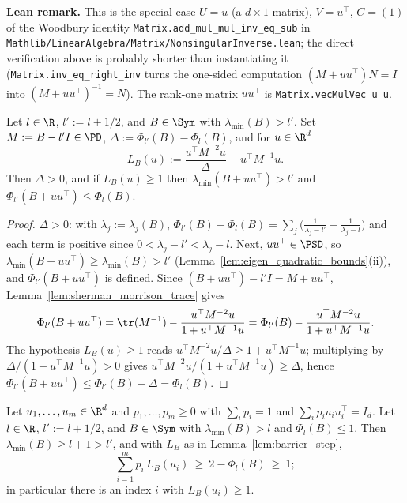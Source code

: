 \textbf{Lean remark.} This is the special case $U = u$ (a $d \times 1$ matrix), $V = u^\top$,
$C = (1)$ of the Woodbury identity \texttt{Matrix.add\_mul\_mul\_inv\_eq\_sub} in
\texttt{Mathlib/LinearAlgebra/Matrix/NonsingularInverse.lean}; the direct verification above is
probably shorter than instantiating it (\texttt{Matrix.inv\_eq\_right\_inv} turns the one-sided
computation $(M + uu^\top)N = I$ into $(M+uu^\top)^{-1} = N$). The rank-one
matrix $uu^\top$ is \texttt{Matrix.vecMulVec u u}.

\begin{lemma}\label{lem:barrier_step}
\leanok
{}
Let $l \in \R$, $l' := l + 1/2$, and $B \in \Sym$ with $\lambda_{\min}(B) > l'$. Set
$M := B - l'I \in \PD$, $\Delta := \Phi_{l'}(B) - \Phi_l(B)$, and for $u \in \R^d$
\[
  L_B(u) := \frac{u^\top M^{-2}u}{\Delta} - u^\top M^{-1}u .
\]
Then $\Delta > 0$, and if $L_B(u) \ge 1$ then
$\lambda_{\min}(B + uu^\top) > l'$ and $\Phi_{l'}(B + uu^\top) \le \Phi_l(B)$.
\end{lemma}

\begin{proof}
\leanok
{}
$\Delta > 0$: with $\lambda_j := \lambda_j(B)$, $\Phi_{l'}(B) - \Phi_l(B) = \sum_j\big(\tfrac{1}{\lambda_j - l'} -
\tfrac{1}{\lambda_j - l}\big)$ and each term is positive since $0 < \lambda_j - l' < \lambda_j - l$.
Next, $uu^\top \in \PSD$, so $\lambda_{\min}(B + uu^\top) \ge \lambda_{\min}(B) > l'$
(Lemma~\ref{lem:eigen_quadratic_bounds}(ii)), and $\Phi_{l'}(B + uu^\top)$ is defined. Since
$(B + uu^\top) - l'I = M + uu^\top$, Lemma~\ref{lem:sherman_morrison_trace} gives
\[
  \Phi_{l'}(B + uu^\top) = \tr(M^{-1}) - \frac{u^\top M^{-2}u}{1 + u^\top M^{-1}u}
  = \Phi_{l'}(B) - \frac{u^\top M^{-2}u}{1 + u^\top M^{-1}u} .
\]
The hypothesis $L_B(u) \ge 1$ reads $u^\top M^{-2}u/\Delta \ge 1 + u^\top M^{-1}u$; multiplying by
$\Delta/(1 + u^\top M^{-1}u) > 0$ gives $u^\top M^{-2}u/(1 + u^\top M^{-1}u) \ge \Delta$, hence
$\Phi_{l'}(B + uu^\top) \le \Phi_{l'}(B) - \Delta = \Phi_l(B)$.
\end{proof}

\begin{lemma}\label{lem:barrier_average}
\leanok
{}
Let $u_1,\dots,u_m \in \R^d$ and $p_1,\dots,p_m \ge 0$ with $\sum_ip_i = 1$ and
$\sum_i p_iu_iu_i^\top = I_d$. Let $l \in \R$, $l' := l + 1/2$, and $B \in \Sym$ with
$\lambda_{\min}(B) > l$ and $\Phi_l(B) \le 1$. Then $\lambda_{\min}(B) \ge l + 1 > l'$, and with
$L_B$ as in Lemma~\ref{lem:barrier_step},
\[
  \sum_{i=1}^m p_i\,L_B(u_i) \ \ge\ 2 - \Phi_l(B) \ \ge\ 1 ;
\]
in particular there is an index $i$ with $L_B(u_i) \ge 1$.
\end{lemma}

